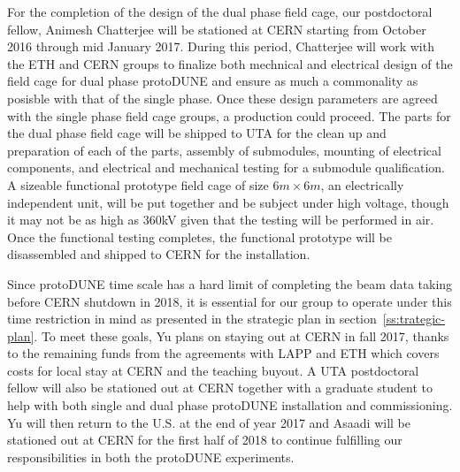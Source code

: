 For the completion of the design of the dual phase field cage, our postdoctoral fellow, Animesh Chatterjee will be stationed at CERN starting from October 2016 through mid January 2017.   During this period, Chatterjee will work with the ETH and CERN groups to finalize both mechnical and electrical design of the field cage for dual phase protoDUNE and ensure as much a commonality as posisble with that of the single phase.  Once these design parameters are agreed with the single phase field cage groups, a production could proceed.  The parts for the dual phase field cage will be shipped to UTA for the clean up and preparation of each of the parts, assembly of submodules, mounting of electrical components, and electrical and mechanical testing for a submodule qualification. A sizeable functional prototype field cage of size $6m\times 6m$, an electrically independent unit, will be put together and be subject under high voltage, though it may not be as high as 360kV given that the testing will be performed in air.  Once the functional testing completes, the functional prototype will be disassembled and shipped to CERN for the installation.

Since protoDUNE time scale has a hard limit of completing the beam data taking before CERN shutdown in 2018, it is essential for our group to operate under this time restriction in mind as presented in the strategic plan in section~\ref{ss:trategic-plan}.  To meet these goals, Yu plans on staying out at CERN in fall 2017, thanks to the remaining funds from the agreements with LAPP and ETH which covers costs for local stay at CERN and the teaching buyout.   A UTA postdoctoral fellow will also be stationed out at CERN together with a graduate student to help with both single and dual phase protoDUNE installation and commissioning.   Yu will then return to the U.S. at the end of year 2017 and Asaadi will be stationed out at CERN for the first half of 2018 to continue fulfilling our responsibilities in both the protoDUNE experiments.
